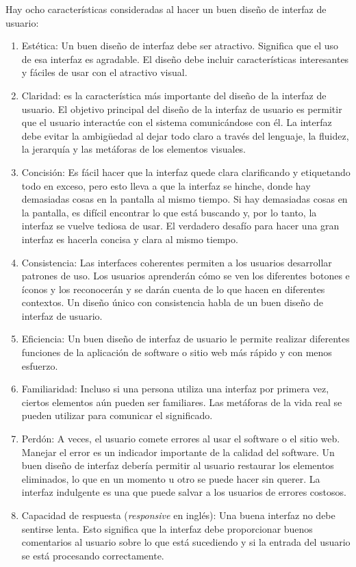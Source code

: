 Hay ocho características consideradas al hacer un buen diseño de interfaz de usuario:
\begin{enumerate}
\item Estética: Un buen diseño de interfaz debe ser atractivo. Significa que el uso de esa interfaz es agradable. El diseño debe incluir características interesantes y fáciles de usar con el atractivo visual.
\item Claridad: es la característica más importante del diseño de la interfaz de usuario. El objetivo principal del diseño de la interfaz de usuario es permitir que el usuario interactúe con el sistema comunicándose con él. La interfaz debe evitar la ambigüedad al dejar todo claro a través del lenguaje, la fluidez, la jerarquía y las metáforas de los elementos visuales.
\item Concisión: Es fácil hacer que la interfaz quede clara clarificando y etiquetando todo en exceso, pero esto lleva a que la interfaz se hinche, donde hay demasiadas cosas en la pantalla al mismo tiempo. Si hay demasiadas cosas en la pantalla, es difícil encontrar lo que está buscando y, por lo tanto, la interfaz se vuelve tediosa de usar. El verdadero desafío para hacer una gran interfaz es hacerla concisa y clara al mismo tiempo.
\item Consistencia: Las interfaces coherentes permiten a los usuarios desarrollar patrones de uso. Los usuarios aprenderán cómo se ven los diferentes botones e íconos y los reconocerán y se darán cuenta de lo que hacen en diferentes contextos. Un diseño único con consistencia habla de un buen diseño de interfaz de usuario.
\item Eficiencia: Un buen diseño de interfaz de usuario le permite realizar diferentes funciones de la aplicación de software o sitio web más rápido y con menos esfuerzo.
\item Familiaridad: Incluso si una persona utiliza una interfaz por primera vez, ciertos elementos aún pueden ser familiares. Las metáforas de la vida real se pueden utilizar para comunicar el significado.
\item Perdón: A veces, el usuario comete errores al usar el software o el sitio web. Manejar el error es un indicador importante de la calidad del software. Un buen diseño de interfaz debería permitir al usuario restaurar los elementos eliminados, lo que en un momento u otro se puede hacer sin querer. La interfaz indulgente es una que puede salvar a los usuarios de errores costosos.
\item Capacidad de respuesta (\textit{responsive} en inglés): Una buena interfaz no debe sentirse lenta. Esto significa que la interfaz debe proporcionar buenos comentarios al usuario sobre lo que está sucediendo y si la entrada del usuario se está procesando correctamente.
\end{enumerate}

